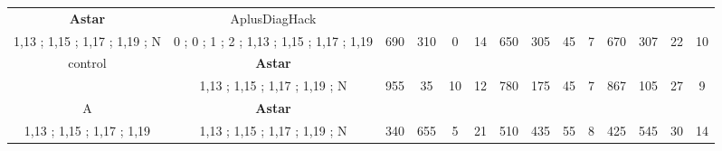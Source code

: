 \begin{table}[]
{\begin{tabular}{|c|c|c|c|c|c|c|c|c|c|c|c|c|c|}
\cellcolor{blue!15}\textbf{Astar} & AplusDiagHack& {\color[HTML]{00009B} } & {\color[HTML]{9A0000} } & {\color[HTML]{009901} } &  & {\color[HTML]{00009B} } & {\color[HTML]{9A0000} } & {\color[HTML]{009901} } &  & {\color[HTML]{00009B} } & {\color[HTML]{9A0000} } & {\color[HTML]{009901} } &  \\ 
\cellcolor{ blue!15}1,13 ; 1,15 ; 1,17 ; 1,19 ; N & 0 ; 0 ; 1 ; 2 ; 1,13 ; 1,15 ; 1,17 ; 1,19 & \multirow{-2}{*}{{\color[HTML]{00009B} 690}} & \multirow{-2}{*}{{\color[HTML]{9A0000} 310}} & \multirow{-2}{*}{{\color[HTML]{009901} 0}} & \multirow{-2}{*}{14} & \multirow{-2}{*}{{\color[HTML]{00009B} 650}} & \multirow{-2}{*}{{\color[HTML]{9A0000} 305}} & \multirow{-2}{*}{{\color[HTML]{009901} 45}} & \multirow{-2}{*}{7} & \multirow{-2}{*}{{\color[HTML]{00009B} 670}} & \multirow{-2}{*}{{\color[HTML]{9A0000} 307}} & \multirow{-2}{*}{{\color[HTML]{009901} 22}} & \multirow{-2}{*}{10} \\ \hline

control & \cellcolor{blue!15}\textbf{Astar}& {\color[HTML]{00009B} } & {\color[HTML]{9A0000} } & {\color[HTML]{009901} } &  & {\color[HTML]{00009B} } & {\color[HTML]{9A0000} } & {\color[HTML]{009901} } &  & {\color[HTML]{00009B} } & {\color[HTML]{9A0000} } & {\color[HTML]{009901} } &  \\ 
 & \cellcolor{ blue!15}1,13 ; 1,15 ; 1,17 ; 1,19 ; N & \multirow{-2}{*}{{\color[HTML]{00009B} 955}} & \multirow{-2}{*}{{\color[HTML]{9A0000} 35}} & \multirow{-2}{*}{{\color[HTML]{009901} 10}} & \multirow{-2}{*}{12} & \multirow{-2}{*}{{\color[HTML]{00009B} 780}} & \multirow{-2}{*}{{\color[HTML]{9A0000} 175}} & \multirow{-2}{*}{{\color[HTML]{009901} 45}} & \multirow{-2}{*}{7} & \multirow{-2}{*}{{\color[HTML]{00009B} 867}} & \multirow{-2}{*}{{\color[HTML]{9A0000} 105}} & \multirow{-2}{*}{{\color[HTML]{009901} 27}} & \multirow{-2}{*}{9} \\ \hline

A & \cellcolor{blue!15}\textbf{Astar}& {\color[HTML]{00009B} } & {\color[HTML]{9A0000} } & {\color[HTML]{009901} } &  & {\color[HTML]{00009B} } & {\color[HTML]{9A0000} } & {\color[HTML]{009901} } &  & {\color[HTML]{00009B} } & {\color[HTML]{9A0000} } & {\color[HTML]{009901} } &  \\ 
1,13 ; 1,15 ; 1,17 ; 1,19 & \cellcolor{ blue!15}1,13 ; 1,15 ; 1,17 ; 1,19 ; N & \multirow{-2}{*}{{\color[HTML]{00009B} 340}} & \multirow{-2}{*}{{\color[HTML]{9A0000} 655}} & \multirow{-2}{*}{{\color[HTML]{009901} 5}} & \multirow{-2}{*}{21} & \multirow{-2}{*}{{\color[HTML]{00009B} 510}} & \multirow{-2}{*}{{\color[HTML]{9A0000} 435}} & \multirow{-2}{*}{{\color[HTML]{009901} 55}} & \multirow{-2}{*}{8} & \multirow{-2}{*}{{\color[HTML]{00009B} 425}} & \multirow{-2}{*}{{\color[HTML]{9A0000} 545}} & \multirow{-2}{*}{{\color[HTML]{009901} 30}} & \multirow{-2}{*}{14} \\ \hline


\end{tabular}}
\end{table}
